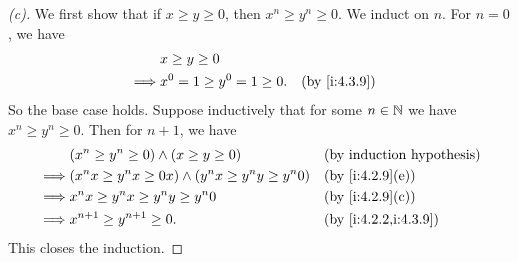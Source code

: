 \begin{proof}[(c)]
  We first show that if \(x \geq y \geq 0\), then \(x^n \geq y^n \geq 0\).
  We induct on \(n\).
  For \(n = 0\), we have
  \begin{align*}
             & x \geq y \geq 0                                \\
    \implies & x^0 = 1 \geq y^0 = 1 \geq 0. &  & \by{i:4.3.9}
  \end{align*}
  So the base case holds.
  Suppose inductively that for some \(n \in \mathbb{N}\) we have \(x^n \geq y^n \geq 0\).
  Then for \(n + 1\), we have
  \begin{align*}
             & (x^n \geq y^n \geq 0) \land (x \geq y \geq 0)                  &  & \byIH                \\
    \implies & (x^n x \geq y^n x \geq 0x) \land (y^n x \geq y^n y \geq y^n 0) &  & \by{i:4.2.9}[e]      \\
    \implies & x^n x \geq y^n x \geq y^n y \geq y^n 0                         &  & \by{i:4.2.9}[c]      \\
    \implies & x^{n + 1} \geq y^{n + 1} \geq 0.                               &  & \by{i:4.2.2,i:4.3.9}
  \end{align*}
  This closes the induction.


\end{proof}
